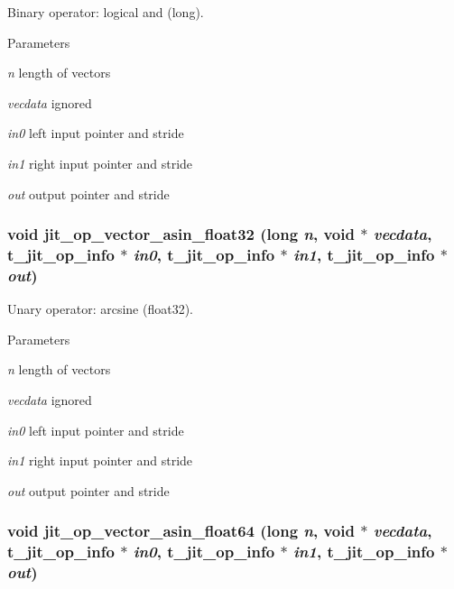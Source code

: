 Binary operator: logical and (long). 
\begin{DoxyParams}{Parameters}
\item[{\em n}]length of vectors \item[{\em vecdata}]ignored \item[{\em in0}]left input pointer and stride \item[{\em in1}]right input pointer and stride \item[{\em out}]output pointer and stride \end{DoxyParams}
\hypertarget{group__opvecmod_ga796ea33b72e94a4ceef0077be3def292}{
\subsubsection[{jit\_\-op\_\-vector\_\-asin\_\-float32}]{\setlength{\rightskip}{0pt plus 5cm}void jit\_\-op\_\-vector\_\-asin\_\-float32 (long {\em n}, \/  void $\ast$ {\em vecdata}, \/  {\bf t\_\-jit\_\-op\_\-info} $\ast$ {\em in0}, \/  {\bf t\_\-jit\_\-op\_\-info} $\ast$ {\em in1}, \/  {\bf t\_\-jit\_\-op\_\-info} $\ast$ {\em out})}}
\label{group__opvecmod_ga796ea33b72e94a4ceef0077be3def292}


Unary operator: arcsine (float32). 
\begin{DoxyParams}{Parameters}
\item[{\em n}]length of vectors \item[{\em vecdata}]ignored \item[{\em in0}]left input pointer and stride \item[{\em in1}]right input pointer and stride \item[{\em out}]output pointer and stride \end{DoxyParams}
\hypertarget{group__opvecmod_ga9a93eeba3437c85fdaeb1b43f208593e}{
\subsubsection[{jit\_\-op\_\-vector\_\-asin\_\-float64}]{\setlength{\rightskip}{0pt plus 5cm}void jit\_\-op\_\-vector\_\-asin\_\-float64 (long {\em n}, \/  void $\ast$ {\em vecdata}, \/  {\bf t\_\-jit\_\-op\_\-info} $\ast$ {\em in0}, \/  {\bf t\_\-jit\_\-op\_\-info} $\ast$ {\em in1}, \/  {\bf t\_\-jit\_\-op\_\-info} $\ast$ {\em out})}}
\label{group__opvecmod_ga9a93eeba3437c85fdaeb1b43f208593e}


